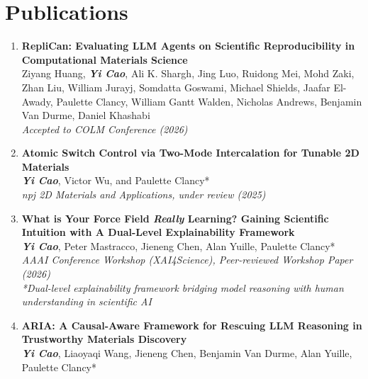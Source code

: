 \documentclass[10pt, letterpaper]{article}
\let\hrefWithoutArrow\href
\renewcommand{\href}[2]{\hrefWithoutArrow{#1}{\mbox{\ifthenelse{\equal{#2}{}}{ }{#2 }\raisebox{.15ex}{\footnotesize \faExternalLink*}}}}
\begin{document}
\section{Publications}

\begin{enumerate}
    \item \textbf{RepliCan: Evaluating LLM Agents on Scientific Reproducibility in Computational Materials Science} \\
    Ziyang Huang, \textbf{\textit{Yi Cao}}, Ali K. Shargh, Jing Luo, Ruidong Mei, Mohd Zaki, Zhan Liu, William Jurayj, Somdatta Goswami, Michael Shields, Jaafar El-Awady, Paulette Clancy, William Gantt Walden, Nicholas Andrews, Benjamin Van Durme, Daniel Khashabi \\
    \textit{Accepted to COLM Conference (2026)} \quad \href{https://arxiv.org/abs/2605.00803}{\faBook\ }
    \quad \href{https://github.com/JHU-CLSP/AutoMat}{\faGithub\ }
    \quad \href{https://jhu-clsp.github.io/AutoMat/}{\faGlobe}
    \item \textbf{Atomic Switch Control via Two-Mode Intercalation for Tunable 2D Materials} \\
    \textbf{\textit{Yi Cao}}, Victor Wu, and Paulette Clancy* \\
    \textit{npj 2D Materials and Applications, under review (2025)} 
    \item \textbf{What is Your Force Field \textit{Really} Learning? Gaining Scientific Intuition with A Dual-Level Explainability Framework} \\
    \textbf{\textit{Yi Cao}}, Peter Mastracco, Jieneng Chen, Alan Yuille, Paulette Clancy* \\ 
    \textit{AAAI Conference Workshop (XAI4Science), Peer-reviewed Workshop Paper (2026)}
     \quad \href{https://openreview.net/forum?id=K95Tt6fYud}{\faBook} 
     \quad \href{https://github.com/yicao-elina/MigrationBench}{\faGithub\ }\\
    \textit{*Dual-level explainability framework bridging model reasoning with human understanding in scientific AI}
    \item \textbf{ARIA: A Causal-Aware Framework for Rescuing LLM Reasoning in Trustworthy Materials Discovery} \\
    \textbf{\textit{Yi Cao}}, Liaoyaqi Wang, Jieneng Chen, Benjamin Van Durme, Alan Yuille, Paulette Clancy* \\

\end{enumerate}
\end{document}
